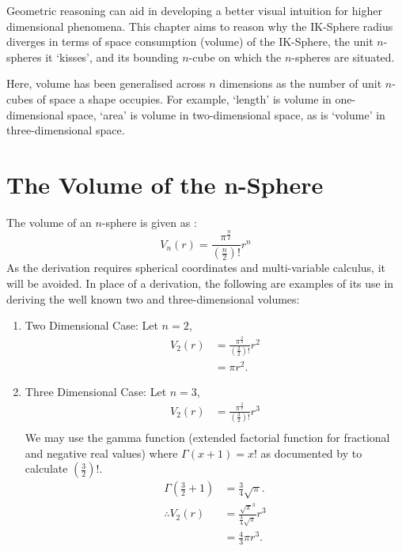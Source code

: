 Geometric reasoning can aid in developing a better visual intuition for higher dimensional phenomena. This chapter aims to reason why the IK-Sphere radius diverges in terms of space consumption (volume) of the IK-Sphere, the unit $n$-spheres it `kisses', and its bounding $n$-cube on which the $n$-spheres are situated.

\begin{definition}[Volume]
    Here, volume has been generalised across $n$ dimensions as the number of unit $n$-cubes of space a shape occupies. For example, `length' is volume in one-dimensional space, `area' is volume in two-dimensional space, as is `volume' in three-dimensional space. 
\end{definition}

\section{The Volume of the n-Sphere}
The volume of an $n$-sphere is given as \cite{formula_n_sphere}:
\begin{equation}\label{eq:vol of sphere}
    V_n(r)=\frac{\pi^{\frac{n}{2}}}{\left(\frac{n}{2}\right)!}r^n
\end{equation}
As the derivation requires spherical coordinates and multi-variable calculus, it will be avoided. In place of a derivation, the following are examples of its use in deriving the well known two and three-dimensional volumes:
\begin{enumerate}
    \item Two Dimensional Case:
    Let $n=2$,
    \begin{align*}
        V_2(r)&=\frac{\pi^{\frac{2}{2}}}{\left(\frac{2}{2}\right)!}r^2\\
        &=\pi r^2.
    \end{align*}
    \item Three Dimensional Case:
    Let $n=3$,
    \begin{align*}
        V_2(r)&=\frac{\pi^{\frac{3}{2}}}{\left(\frac{3}{2}\right)!}r^3\\
    \end{align*}
    We may use the gamma function (extended factorial function for fractional and negative real values) where $\Gamma(x+1)=x!$ as documented by \cite{gronau2003gamma} to calculate $\left(\frac{3}{2}\right)!$.
    \begin{align*}
        \Gamma\left(\frac{3}{2}+1\right)&=\frac{3}{4}\sqrt{\pi}.\\
        \therefore V_2(r)&=\frac{\sqrt{\pi}^3}{\frac{3}{4}\sqrt{\pi}}r^3\\
        &=\frac{4}{3}\pi r^3.
    \end{align*}
\end{enumerate}

